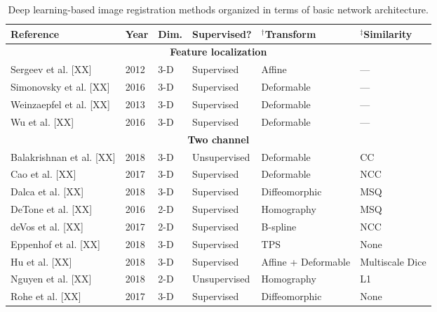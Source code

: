 

\begin{table}[!htb]
\centering
\caption{Deep learning-based image registration methods organized in terms of basic
         network architecture.}
\label{table:methods}
\begin{tabular*}{\textwidth}{l@{\extracolsep{\fill}}l@{\extracolsep{\fill}}l@{\extracolsep{\fill}}l@{\extracolsep{\fill}}l@{\extracolsep{\fill}}l}
\toprule
\midrule
\textbf{Reference} & \textbf{Year} & \textbf{Dim.} & \textbf{Supervised?} & $^\dagger$\textbf{Transform} & $^\ddagger$\textbf{Similarity} \\
\midrule
\midrule
\multicolumn{6}{c}{\textbf{Feature localization}}
  \vspace{0.25cm} \\
  Sergeev et al. [XX] & 2012 & 3-D & Supervised & Affine & --- \\
  Simonovsky et al. [XX] & 2016 & 3-D & Supervised & Deformable & --- \\
  Weinzaepfel et al. [XX] & 2013 & 3-D & Supervised & Deformable & --- \\
  Wu et al. [XX] & 2016 & 3-D & Supervised & Deformable & --- \\
\midrule
\multicolumn{6}{c}{\textbf{Two channel}}
  \vspace{0.25cm} \\
  Balakrishnan et al. [XX] & 2018 & 3-D & Unsupervised & Deformable & CC \\
  Cao et al. [XX] & 2017 & 3-D & Supervised & Deformable & NCC \\
  Dalca et al. [XX] & 2018 & 3-D & Supervised & Diffeomorphic & MSQ \\
  DeTone et al. [XX] & 2016 & 2-D & Supervised & Homography & MSQ \\
  deVos et al. [XX] & 2017 & 2-D & Supervised & B-spline & NCC \\
  Eppenhof et al. [XX] & 2018 & 3-D & Supervised & TPS & None \\       %
  Hu et al. [XX] & 2018 & 3-D & Supervised & Affine + Deformable & Multiscale Dice \\
  Nguyen et al. [XX] & 2018 & 2-D & Unsupervised & Homography & L1 \\
  Rohe et al. [XX] & 2017 & 3-D & Supervised & Diffeomorphic & None \\  %

\end{tabular*}
\end{table}
